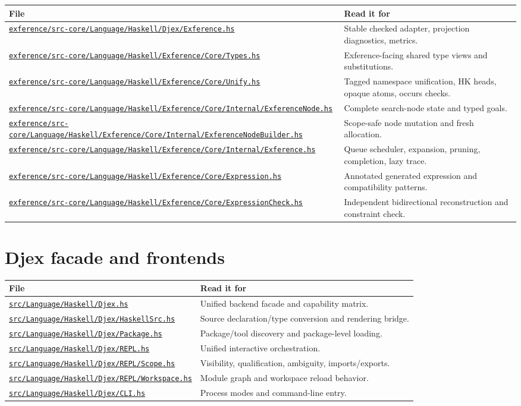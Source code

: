 \documentclass[10pt,letterpaper,oneside]{report}
\def\DjexBase{https://github.com/VladimirReshetnikov/Djex/blob/e454757d53ec057238c22fc6cd0d935b7d96b3dc/}
\newcommand{\dpath}[1]{\href{\DjexBase#1}{\nolinkurl{#1}}}
\begin{document}
\begin{longtable}{@{}L{0.49\textwidth}L{0.43\textwidth}@{}}
\toprule
\textbf{File} & \textbf{Read it for} \\
\midrule
\endhead
\dpath{exference/src-core/Language/Haskell/Djex/Exference.hs} & Stable checked adapter, projection diagnostics, metrics. \\
\dpath{exference/src-core/Language/Haskell/Exference/Core/Types.hs} & Exference-facing shared type views and substitutions. \\
\dpath{exference/src-core/Language/Haskell/Exference/Core/Unify.hs} & Tagged namespace unification, HK heads, opaque atoms, occurs checks. \\
\dpath{exference/src-core/Language/Haskell/Exference/Core/Internal/ExferenceNode.hs} & Complete search-node state and typed goals. \\
\dpath{exference/src-core/Language/Haskell/Exference/Core/Internal/ExferenceNodeBuilder.hs} & Scope-safe node mutation and fresh allocation. \\
\dpath{exference/src-core/Language/Haskell/Exference/Core/Internal/Exference.hs} & Queue scheduler, expansion, pruning, completion, lazy trace. \\
\dpath{exference/src-core/Language/Haskell/Exference/Core/Expression.hs} & Annotated generated expression and compatibility patterns. \\
\dpath{exference/src-core/Language/Haskell/Exference/Core/ExpressionCheck.hs} & Independent bidirectional reconstruction and constraint check. \\
\bottomrule
\end{longtable}

\section{Djex facade and frontends}

\begin{longtable}{@{}L{0.42\textwidth}L{0.50\textwidth}@{}}
\toprule
\textbf{File} & \textbf{Read it for} \\
\midrule
\endhead
\dpath{src/Language/Haskell/Djex.hs} & Unified backend facade and capability matrix. \\
\dpath{src/Language/Haskell/Djex/HaskellSrc.hs} & Source declaration/type conversion and rendering bridge. \\
\dpath{src/Language/Haskell/Djex/Package.hs} & Package/tool discovery and package-level loading. \\
\dpath{src/Language/Haskell/Djex/REPL.hs} & Unified interactive orchestration. \\
\dpath{src/Language/Haskell/Djex/REPL/Scope.hs} & Visibility, qualification, ambiguity, imports/exports. \\
\dpath{src/Language/Haskell/Djex/REPL/Workspace.hs} & Module graph and workspace reload behavior. \\
\dpath{src/Language/Haskell/Djex/CLI.hs} & Process modes and command-line entry. \\
\bottomrule
\end{longtable}
\end{document}

